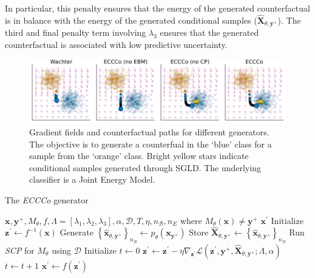 In particular, this penalty ensures that the energy of the generated counterfactual is in balance with the energy of the generated conditional samples ($\widehat{\mathbf{X}}_{\theta,\mathbf{y}^+}$). The third and final penalty term involving $\lambda_3$ ensures that the generated counterfactual is associated with low predictive uncertainty.

\begin{figure}
  \centering
  \includegraphics[width=1.0\linewidth]{../artifacts/results/images/poc_gradient_fields.png}
  \caption{Gradient fields and counterfactual paths for different generators. The objective is to generate a counterfual in the `blue' class for a sample from the `orange' class. Bright yellow stars indicate conditional samples generated through SGLD. The underlying classifier is a Joint Energy Model.}\label{fig:poc}
\end{figure}

\begin{algorithm*}
  \caption{The \textit{ECCCo} generator}\label{alg:eccco}
  \begin{algorithmic}[1]
    \Require $\mathbf{x}, \mathbf{y}^+, M_{\theta}, f, \Lambda=[\lambda_1,\lambda_2,\lambda_3], \alpha, \mathcal{D}, T, \eta, n_{\mathcal{B}}, n_E$ where $M_{\theta}(\mathbf{x})\neq\mathbf{y}^+$
    \Ensure $\mathbf{x}^\prime$
    \State Initialize $\mathbf{z}^\prime \gets f^{-1}(\mathbf{x})$ 
    \State Generate $\left\{\hat{\mathbf{x}}_{\theta,\mathbf{y}^+}\right\}_{n_{\mathcal{B}}} \gets p_{\theta}(\mathbf{x}_{\mathbf{y}^+})$ 
    \State Store $\widehat{\mathbf{X}}_{\theta,\mathbf{y}^+} \gets \left\{\hat{\mathbf{x}}_{\theta,\mathbf{y}^+}\right\}_{n_{\mathcal{B}}}$ 
    \State Run \textit{SCP} for $M_{\theta}$ using $\mathcal{D}$ 
    \State Initialize $t \gets 0$
     
    \State $\mathbf{z}^\prime \gets \mathbf{z}^\prime - \eta \nabla_{\mathbf{z}^\prime} \mathcal{L}(\mathbf{z}^\prime,\mathbf{y}^+,\widehat{\mathbf{X}}_{\theta,\mathbf{y}^+}; \Lambda, \alpha)$ 
    \State $t \gets t+1$
    \EndWhile
    \State $\mathbf{x}^\prime \gets f(\mathbf{z}^\prime)$ 
  \end{algorithmic}
\end{algorithm*}


